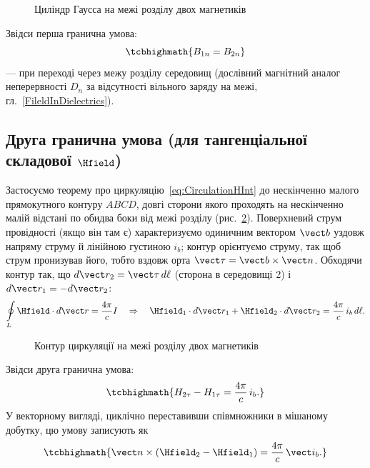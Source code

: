\begin{figure}[h!]\centering
	\caption{Циліндр Гаусса на межі розділу двох магнетиків\label{pic:BC1Mag}}
\end{figure}

Звідси перша гранична умова:
\begin{equation}\label{eq:BC1Magnetic}
	\tcbhighmath{
		B_{1n} = B_{2n}
	}
\end{equation}
---  при переході через межу розділу середовищ (дослівний магнітний аналог
неперервності $D_n$ за відсутності вільного заряду на межі, гл.~\ref{FileldInDielectrics}).

\subsection*{Друга гранична умова (для тангенціальної складової $\Hfield$)}

Застосуємо теорему про циркуляцію~\eqref{eq:CirculationHInt} до нескінченно малого прямокутного контуру $ABCD$, довгі сторони якого проходять
на нескінченно малій відстані по обидва боки від межі розділу (рис.~\ref{pic:BC2Mag}). Поверхневий струм провідності (якщо він там є)
характеризуємо одиничним вектором $\vect b$ уздовж напряму струму й лінійною густиною $i_b$; контур орієнтуємо  струму, так щоб
струм пронизував його, тобто вздовж орта $\vect\tau = \vect b\times\vect n$. Обходячи контур так, що $d\vect r_2 = \vect\tau\, d\ell$ (сторона в
середовищі 2) і $d\vect r_1 = -d\vect r_2$:
\begin{equation*}
	\oint\limits_L \Hfield\cdot d\vect r = \frac{4\pi}c I \quad\Rightarrow\quad \Hfield_1\cdot d\vect r_1 + \Hfield_2\cdot d\vect r_2 =
	\frac{4\pi}c\, i_b\, d\ell.
\end{equation*}

\begin{figure}[h!]\centering
	\caption{Контур циркуляції на межі розділу двох магнетиків\label{pic:BC2Mag}}
\end{figure}

Звідси друга гранична умова:
\begin{equation}\label{eq:BC2MagneticScalar}
	\tcbhighmath{
		H_{2\tau} - H_{1\tau} = \frac{4\pi}c\, i_b.
	}
\end{equation}
У векторному вигляді, циклічно переставивши співмножники в мішаному добутку, цю умову записують як
\begin{equation}\label{eq:BC2MagneticVector}
	\tcbhighmath{
		\vect n\times\left(\Hfield_2 - \Hfield_1\right) = \frac{4\pi}c\, \vect i_b.
	}
\end{equation}

